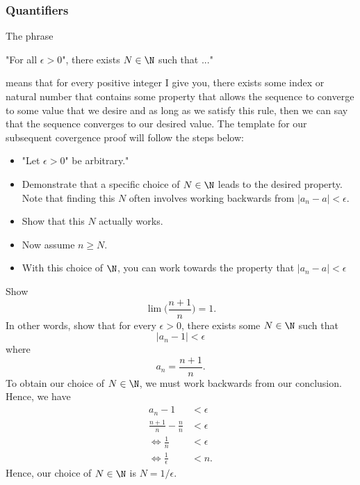 \subsubsection{Quantifiers}

The phrase 

\begin{center}
"For all \( \epsilon> 0 \)", there exists \( N \in \N \) such that ..."
\end{center}

means that for every positive integer I give you, there exists some index or natural number that contains some property that allows the sequence to converge to some value that we desire and as long as we satisfy this rule, then we can say that the sequence converges to our desired value. The template for our subsequent covergence proof will follow the steps below:

\begin{itemize}
    \item "Let \( \epsilon> 0 \)" be arbitrary."
    \item Demonstrate that a specific choice of \( N \in \N \) leads to the desired property. Note that finding this \( N \) often involves working backwards from \( |a_n - a | < \epsilon \). 
    \item Show that this \( N \) actually works.
    \item Now assume \( n \geq N \). 
    \item With this choice of \( \N \), you can work towards the property that \( |a_n - a | < \epsilon \)
\end{itemize}

\begin{example}{}{}
Show 
\[ \lim \Big( \frac{n+1}{n}\Big) = 1.\]
In other words, show that for every \( \epsilon  > 0 \), there exists some \( N \in \N \) such that 
\[ |a_n - 1| < \epsilon \] where 
\[ a_n = \frac{n+1}{n}. \]
To obtain our choice of \( N \in \N \), we must work backwards from our conclusion. Hence, we have 
\begin{align*}
a_n - 1 &< \epsilon  \\
\frac{n+1}{n} - \frac{n}{n} &< \epsilon \\ 
\iff \frac{1}{n} &<  \epsilon \\
\iff \frac{1}{ \epsilon } &< n.
\end{align*}
Hence, our choice of \( N \in \N \) is \( N = 1/ \epsilon \). 
\end{example}%


